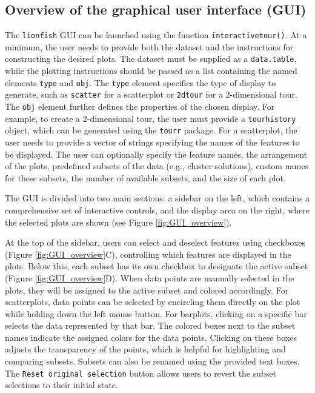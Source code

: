 \documentclass[article]{ajs}
\begin{document}
\subsection{Overview of the graphical user interface (GUI)}

The \texttt{lionfish} GUI can be launched using the function \texttt{interactive\textunderscore tour()}. At a minimum, the user needs to provide both the dataset and the instructions for constructing the desired plots. The dataset must be supplied as a \texttt{data.table}, while the plotting instructions should be passed as a list containing the named elements \texttt{type} and \texttt{obj}. The \texttt{type} element specifies the type of display to generate, such as \texttt{scatter} for a scatterplot or \texttt{2d\textunderscore tour} for a 2-dimensional tour. The \texttt{obj} element further defines the properties of the chosen display. For example, to create a 2-dimensional tour, the user must provide a \texttt{tour\textunderscore history} object, which can be generated using the \texttt{tourr} package. For a scatterplot, the user needs to provide a vector of strings specifying the names of the features to be displayed. The user can optionally specify the feature names, the arrangement of the plots, predefined subsets of the data (e.g., cluster solutions), custom names for these subsets, the number of available subsets, and the size of each plot.

The GUI is divided into two main sections: a sidebar on the left, which contains a comprehensive set of interactive controls, and the display area on the right, where the selected plots are shown (see Figure \ref{fig:GUI_overview}).

At the top of the sidebar, users can select and deselect features using checkboxes (Figure \ref{fig:GUI_overview}C), controlling which features are displayed in the plots. Below this, each subset has its own checkbox to designate the active subset (Figure \ref{fig:GUI_overview}D). When data points are manually selected in the plots, they will be assigned to the active subset and colored accordingly. For scatterplots, data points can be selected by encircling them directly on the plot while holding down the left mouse button. For barplots, clicking on a specific bar selects the data represented by that bar. The colored boxes next to the subset names indicate the assigned colors for the data points. Clicking on these boxes adjusts the transparency of the points, which is helpful for highlighting and comparing subsets. Subsets can also be renamed using the provided text boxes. The \texttt{Reset original selection} button allows users to revert the subset selections to their initial state.
\end{document}
